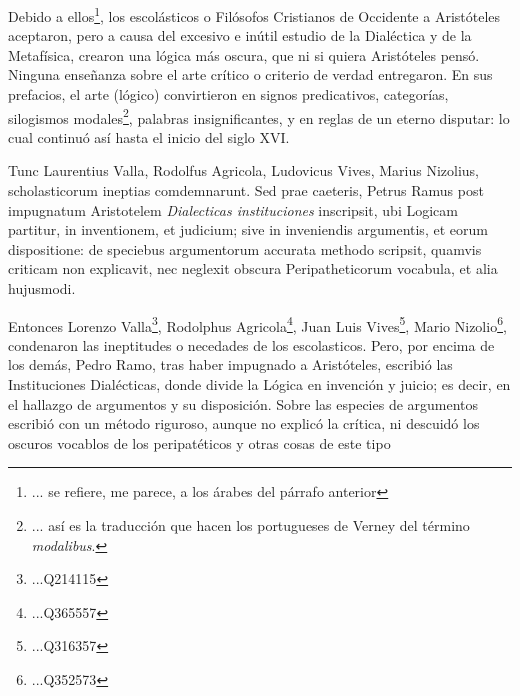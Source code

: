 \message{ !name(tractatus.tex)}\documentclass{article}
\begin{document}
\begin{paracol}{2}
\begin{nthcolumn*}{0}
\end{nthcolumn*}
\vspace{0.5cm}
\begin{nthcolumn}{1} %
  Debido a ellos\footnote{... se refiere, me parece, a los árabes del párrafo anterior}, los escolásticos o Filósofos Cristianos de Occidente a Aristóteles aceptaron, pero a causa del excesivo e inútil estudio de la Dialéctica y de la Metafísica, crearon una lógica más oscura, que ni si quiera Aristóteles pensó. Ninguna enseñanza sobre el arte crítico o criterio de verdad entregaron. En sus prefacios, el arte (lógico) convirtieron en signos predicativos, categorías, silogismos modales\footnote{... así es la traducción que hacen los portugueses de Verney del término \emph{modalibus}.}, palabras insignificantes, y en reglas de un eterno disputar: lo cual continuó así hasta el inicio del siglo XVI.
\end{nthcolumn}
\vspace{0.5cm}
\begin{nthcolumn*}{0} %
  Tunc Laurentius Valla, Rodolfus Agricola, Ludovicus Vives, Marius Nizolius, scholasticorum ineptias comdemnarunt. Sed prae caeteris, Petrus Ramus post impugnatum Aristotelem \emph{Dialecticas instituciones} inscripsit, ubi Logicam partitur, in inventionem, et judicium; sive in inveniendis argumentis, et eorum dispositione: de speciebus argumentorum accurata methodo scripsit, quamvis criticam non explicavit, nec neglexit obscura Peripatheticorum vocabula, et alia hujusmodi.
\end{nthcolumn*}
\vspace{0.5cm}
\begin{nthcolumn}{1} %
  Entonces Lorenzo Valla\footnote{...Q214115}, Rodolphus Agricola\footnote{...Q365557}, Juan Luis Vives\footnote{...Q316357}, Mario Nizolio\footnote{...Q352573}, condenaron las ineptitudes o necedades de los escolasticos. Pero, por encima de los demás, Pedro Ramo, tras haber impugnado a Aristóteles, escribió las Instituciones Dialécticas, donde divide la Lógica en invención y juicio; es decir, en el hallazgo de argumentos y su disposición. Sobre las especies de argumentos escribió con un método riguroso, aunque no explicó la crítica, ni descuidó los oscuros vocablos de los peripatéticos y otras cosas de este tipo
\end{nthcolumn}
\vspace{0.5cm}
\end{paracol}
\end{document}
